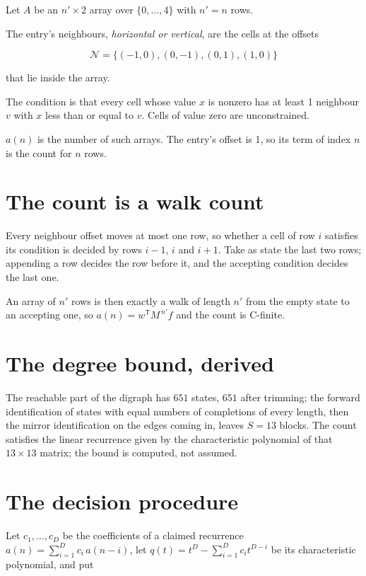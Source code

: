 \documentclass[11pt]{article}
\theoremstyle{definition}
\begin{document}
Let $A$ be an $n' \times 2$ array over $\{0,\dots,4\}$ with $n' = n$ rows.

The entry's neighbours, {\itshape horizontal or vertical}, are the cells at the offsets

\[\mathcal{N} = \{(-1,0), (0,-1), (0,1), (1,0)\}\]

that lie inside the array.

The condition is that every cell whose value $x$ is nonzero has at least 1 neighbour $v$ with $x$ less than or equal to $v$. Cells of value zero are unconstrained.

$a(n)$ is the number of such arrays. The entry's offset is 1, so its term of index $n$ is the count for $n$ rows.

\section{The count is a walk count}

Every neighbour offset moves at most one row, so whether a cell of row $i$ satisfies its condition is decided by rows $i-1$, $i$ and $i+1$. Take as state the last two rows; appending a row decides the row before it, and the accepting condition decides the last one.

An array of $n'$ rows is then exactly a walk of length $n'$ from the empty state to an accepting one, so $a(n) = w^{\mathsf T}M^{\,n'}f$ and the count is C-finite.

\section{The degree bound, derived}

The reachable part of the digraph has $651$ states, $651$ after trimming; the forward identification of states with equal numbers of completions of every length, then the mirror identification on the edges coming in, leaves $S = 13$ blocks. The count satisfies the linear recurrence given by the characteristic polynomial of that $13\times13$ matrix; the bound is computed, not assumed.

\section{The decision procedure}

Let $c_1,\dots,c_D$ be the coefficients of a claimed recurrence $a(n) = \sum_{i=1}^{D} c_i\,a(n-i)$, let $q(t) = t^{D} - \sum_{i=1}^{D} c_i t^{D-i}$ be its characteristic polynomial, and put
\end{document}
